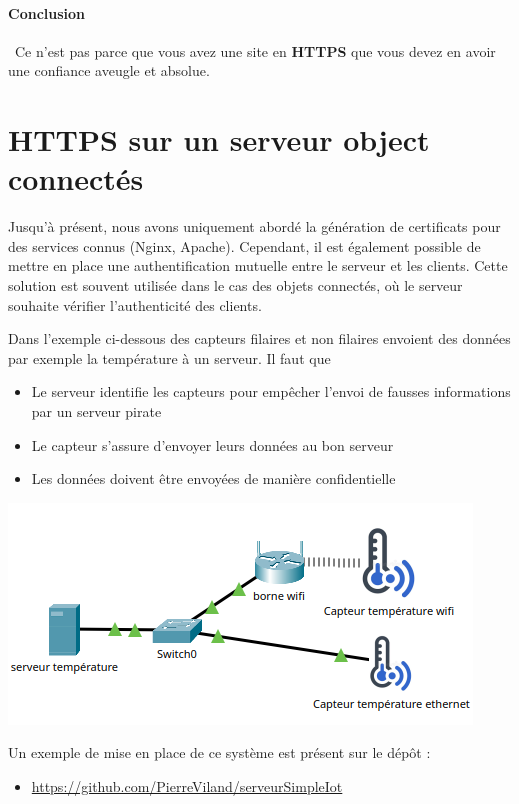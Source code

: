 \documentclass[french, 12pt]{article}%
\newcommand{\itemE}{\item[$\bullet$]}
\begin{document}
\paragraph{Conclusion} \ 
Ce n'est pas parce que vous avez une site en \textbf{HTTPS} que vous devez en avoir une confiance aveugle et absolue.



\section{HTTPS sur un serveur object connectés}

Jusqu'à présent, nous avons uniquement abordé la génération de certificats pour des services connus (Nginx, Apache). Cependant, il est également possible de mettre en place une authentification mutuelle entre le serveur et les clients. Cette solution est souvent utilisée dans le cas des objets connectés, où le serveur souhaite vérifier l'authenticité des clients. 

Dans l'exemple ci-dessous des capteurs filaires et non filaires envoient des données par exemple la température à un serveur. Il faut que 
\begin{itemize}
\itemE Le serveur identifie les capteurs pour empêcher l'envoi de fausses informations par un serveur pirate
\itemE Le capteur s'assure d'envoyer leurs données au bon serveur
\itemE Les données doivent être envoyées de manière confidentielle
\end{itemize}

\begin{center}
\includegraphics[scale=0.7]{./ressource/topoCapteurTemperature.png}
\end{center}


Un exemple de mise en place de ce système est présent sur le dépôt : 
\begin{itemize}
\itemE \href{https://github.com/PierreViland/serveurSimpleIot.git}{https://github.com/PierreViland/serveurSimpleIot}
\end{itemize}
\end{document}
